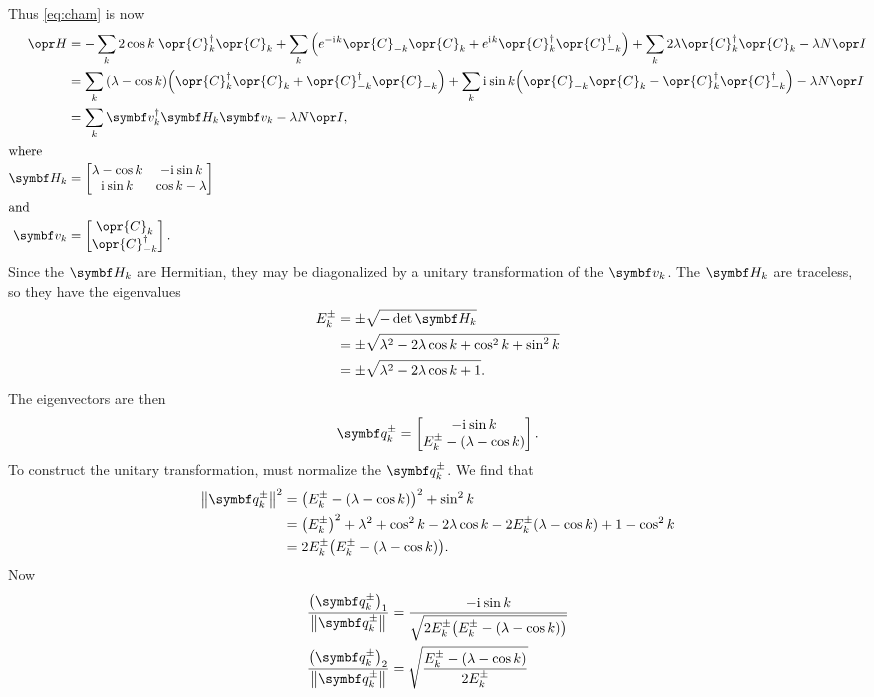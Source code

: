 \documentclass[../thesis.tex]{subfiles}
\begin{document}
Thus \cref{eq:cham} is now
\begin{align}
  \ham
  &= -\sum_k 2 \cos k\; \opr{C}_k^\dag \opr{C}_k
  + \sum_k \qty(%
  e^{-\im k} \opr{C}_{-k} \opr{C}_k
  + e^{\im k} \opr{C}_k^\dag \opr{C}_{-k}^\dag
  )
  + \sum_k 2\lambda\opr{C}_k^\dag\opr{C}_k
  - \lambda N \idopr
  \\
  &= \sum_k \qty(\lambda - \cos k)
  \qty(%
  \opr{C}_k^\dag \opr{C}_k
  + \opr{C}_{-k}^\dag \opr{C}_{-k}
  )
  + \sum_k \im\sin k
  \qty(%
  \opr{C}_{-k}\opr{C}_k
  - \opr{C}_k^\dag\opr{C}_{-k}^\dag
  )
  - \lambda N \idopr \\
  &= \sum_k \vq{v}_k^\dag \mq{H}_k \vq{v}_k
  - \lambda N \idopr,
  \label{eq:Cham} \\
  \shortintertext{where}
  \mq{H}_k
  &= \bmqty{%
  \lambda - \cos k & -\im\sin k \\
  \im\sin k & \cos k - \lambda
  } \\
  \shortintertext{and}
  \vq{v}_k
  &= \bmqty{\opr{C}_k \\ \opr{C}_{-k}^\dag}.
\end{align}
Since the $\mq{H}_k$ are Hermitian, they may be diagonalized by a unitary
transformation of the $\vq{v}_k$. The $\mq{H}_k$ are traceless, so they have the
eigenvalues
\begin{align}
  E_k^\pm
  &= \pm\sqrt{-\det\mq{H}_k} \\
  &= \pm\sqrt{\lambda^2 - 2\lambda\cos k + \cos^2 k + \sin^2 k} \\
  &= \pm\sqrt{\lambda^2 - 2\lambda\cos k + 1}.
\end{align}
The eigenvectors are then
\begin{equation}
  \vq{q}_k^\pm
  = \bmqty{%
    -\im\sin k \\
    E_k^\pm - (\lambda - \cos k)
  }.
\end{equation}
To construct the unitary transformation, must normalize the $\vq{q}_k^\pm$. We
find that
\begin{align}
  \norm{\vq{q}_k^\pm}^2
  &= {\qty(E_k^\pm - (\lambda - \cos k))}^2 + \sin^2 k \\
  &= {\qty(E_k^\pm)}^2 + \lambda^2 + \cos^2 k - 2\lambda\cos k - 2E_k^\pm(\lambda - \cos k) + 1 - \cos^2 k \\
  &= 2E_k^\pm \qty(E_k^\pm - (\lambda - \cos k)).
\end{align}
Now
\begin{align}
  \frac{{\qty(\vq{q}_k^\pm)}_1}{\norm{\vq{q}_k^\pm}}
  &= \frac{-\im\sin k}{\sqrt{2E_k^\pm \qty(E_k^\pm - (\lambda - \cos k))}} \\
  \frac{{\qty(\vq{q}_k^\pm)}_2}{\norm{\vq{q}_k^\pm}}
  &= \sqrt{\frac{E_k^\pm - (\lambda - \cos k)}{2E_k^\pm}}
\end{align}
\end{document}
